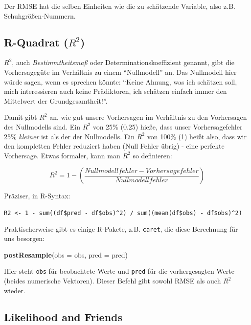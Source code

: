 \documentclass[12pt,ngerman,]{book}
\makeatletter
\newenvironment{Shaded}{\begin{snugshade}}{\end{snugshade}}
\newcommand{\KeywordTok}[1]{\textcolor[rgb]{0.13,0.29,0.53}{\textbf{{#1}}}}
\newcommand{\DataTypeTok}[1]{\textcolor[rgb]{0.13,0.29,0.53}{{#1}}}
\newcommand{\NormalTok}[1]{{#1}}
\newenvironment{kframe}{%
\medskip{}
\setlength{\fboxsep}{.8em}
 \def\at@end@of@kframe{}%
 \ifinner\ifhmode%
  \def\at@end@of@kframe{\end{minipage}}%
  \begin{minipage}{\columnwidth}%
 \fi\fi%
 \def\FrameCommand##1{\hskip\@totalleftmargin \hskip-\fboxsep
 \colorbox{shadecolor}{##1}\hskip-\fboxsep
     \hskip-\linewidth \hskip-\@totalleftmargin \hskip\columnwidth}%
 \MakeFramed {\advance\hsize-\width
   \@totalleftmargin\z@ \linewidth\hsize
   \@setminipage}}%
 {\par\unskip\endMakeFramed%
 \at@end@of@kframe}
\renewenvironment{Shaded}{\begin{kframe}}{\end{kframe}}
\makeatother
\begin{document}
Der RMSE hat die selben Einheiten wie die zu schätzende Variable, also
z.B. Schuhgrößen-Nummern.

\subsection{\texorpdfstring{R-Quadrat
(\(R^2\))}{R-Quadrat (R\^{}2)}}\label{r-quadrat-r2}

\(R^2\), auch \emph{Bestimmtheitsmaß} oder
Determinationskoeffizient genannt, gibt
die Vorhersagegüte im Verhältnis zu einem
``Nullmodell'' an. Das Nullmodell hier würde sagen, wenn es sprechen
könnte: ``Keine Ahnung, was ich schätzen soll, mich interessieren auch
keine Prädiktoren, ich schätzen einfach immer den Mittelwert der
Grundgesamtheit!''.

Damit gibt \(R^2\) an, wie gut unsere Vorhersagen im Verhältnis zu den
Vorhersagen des Nullmodells sind. Ein \(R^2\) von 25\% (0.25) hieße,
dass unser Vorhersagefehler 25\% \emph{kleiner} ist als der der
Nullmodells. Ein \(R^2\) von 100\% (1) heißt also, dass wir den
kompletten Fehler reduziert haben (Null Fehler übrig) - eine perfekte
Vorhersage. Etwas formaler, kann man \(R^2\) so definieren:

\[ R^2 = 1 - \left( \frac{Nullmodellfehler - Vorhersagefehler}{Nullmodellfehler} \right)\]

Präziser, in R-Syntax:

\texttt{R2\ \textless{}-\ 1\ -\ sum((df\$pred\ -\ df\$obs)\^{}2)\ /\ sum((mean(df\$obs)\ -\ df\$obs)\^{}2)}

Praktischerweise gibt es einige R-Pakete, z.B. \texttt{caret}, die diese
Berechnung für uns besorgen:

\begin{Shaded}
\begin{Highlighting}[]

\KeywordTok{postResample}\NormalTok{(}\DataTypeTok{obs =} \NormalTok{obs, }\DataTypeTok{pred =} \NormalTok{pred)}
\end{Highlighting}
\end{Shaded}

Hier steht \texttt{obs} für beobachtete Werte und \texttt{pred} für die
vorhergesagten Werte (beides numerische Vektoren). Dieser Befehl gibt
sowohl RMSE als auch \(R^2\) wieder.

\subsection{Likelihood and Friends}\label{likelihood-and-friends}
\end{document}
